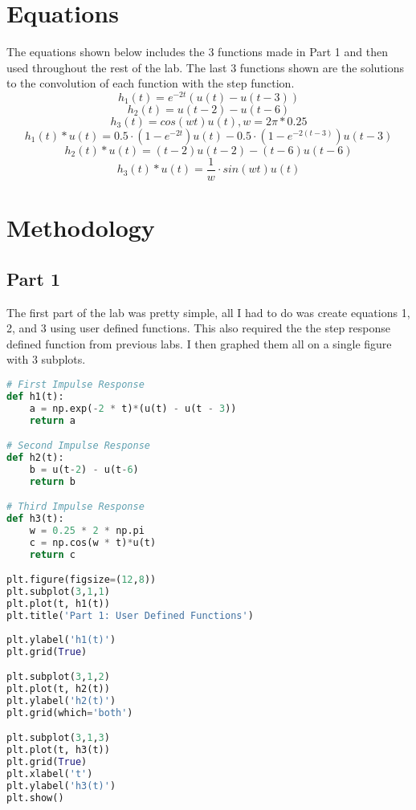 \documentclass[12pt]{report}
\begin{document}
\section{Equations}
The equations shown below includes the 3 functions made in Part 1 and then
used throughout the rest of the lab. The last 3 functions shown are the solutions to the convolution of each function with the
step function.
\begin{equation}
    h_{1}(t) = e^{-2t}(u(t) - u(t-3))
\end{equation}
\begin{equation}
    h_{2}(t) = u(t-2) - u(t-6)
\end{equation}
\begin{equation}
    h_{3}(t) = cos(wt)u(t), w = 2\pi *0.25
\end{equation}
\begin{equation}
    h_{1}(t)\ast u(t) = 0.5\cdot(1 - e^{-2t})u(t) - 0.5\cdot(1 - e^{-2(t-3)})u(t-3) 
\end{equation}
\begin{equation}
    h_{2}(t)\ast u(t) = (t-2)u(t-2) - (t-6)u(t-6)
\end{equation}
\begin{equation}
    h_{3}(t)\ast u(t) = \frac{1}{w}\cdot sin(wt)u(t)
\end{equation}
\section{Methodology}
\subsection{Part 1}
The first part of the lab was pretty simple, all I had to do was create equations 1, 2, and 3 using user defined functions. 
This also required the the step response defined function from
previous labs. I then graphed them all on a single figure with 3 subplots.

\begin{lstlisting}[language=Python]
# First Impulse Response
def h1(t):
    a = np.exp(-2 * t)*(u(t) - u(t - 3))
    return a

# Second Impulse Response
def h2(t):
    b = u(t-2) - u(t-6)
    return b

# Third Impulse Response
def h3(t):
    w = 0.25 * 2 * np.pi
    c = np.cos(w * t)*u(t)
    return c

plt.figure(figsize=(12,8))
plt.subplot(3,1,1)
plt.plot(t, h1(t))
plt.title('Part 1: User Defined Functions') 
                                 
plt.ylabel('h1(t)')
plt.grid(True)

plt.subplot(3,1,2)
plt.plot(t, h2(t))
plt.ylabel('h2(t)') 
plt.grid(which='both')

plt.subplot(3,1,3)
plt.plot(t, h3(t))
plt.grid(True)
plt.xlabel('t') 
plt.ylabel('h3(t)') 
plt.show() 
\end{lstlisting}
\end{document}
